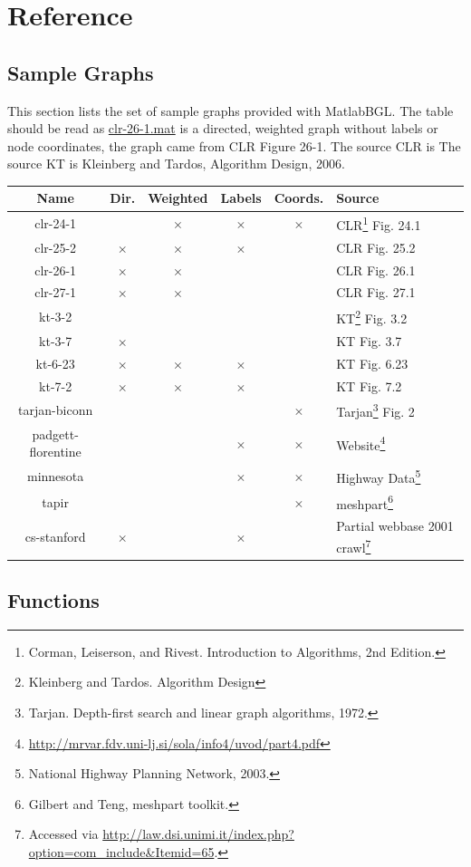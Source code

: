 \documentclass[12pt]{article}
\newcommand{\mycmd}[1]{\url{#1}}
\begin{document}
\section{Reference}

\subsection{Sample Graphs}
This section lists the set of sample graphs provided with MatlabBGL.  The table should be read as \mycmd{clr-26-1.mat} is a directed, weighted graph without labels or node coordinates, the graph came from CLR Figure 26-1.  The source CLR is   The source KT is Kleinberg and Tardos, Algorithm Design, 2006.  
\begin{center}
\begin{tabularx}{\linewidth}{c|cc|cc|X}
\textbf{Name} & \textbf{Dir.} & \textbf{Weighted} & \textbf{Labels} & \textbf{Coords.} & \textbf{Source}\\
\hline
clr-24-1 & & $\times$ & $\times$ & $\times$ & CLR\footnote{Corman, Leiserson, and Rivest. Introduction
 to Algorithms, 2nd Edition.} Fig. 24.1\\
clr-25-2 & $\times$ & $\times$ & $\times$ & & CLR Fig. 25.2\\
clr-26-1 & $\times$ & $\times$ & & & CLR Fig. 26.1\\
clr-27-1 &  $\times$ & $\times$ & & & CLR Fig. 27.1\\
kt-3-2 &  &  & & & KT\footnote{ Kleinberg and Tardos. Algorithm Design} Fig. 3.2\\
kt-3-7 & $\times$ &  & & & KT Fig. 3.7\\
kt-6-23 & $\times$ & $\times$ & $\times$ & & KT Fig. 6.23\\
kt-7-2 & $\times$ & $\times$ & $\times$& & KT Fig. 7.2\\
tarjan-biconn & & & & $\times$ & Tarjan\footnote{Tarjan.  Depth-first search and linear graph algorithms, 1972.} Fig. 2\\
padgett-florentine & & & $\times$ & $\times$ &  Website\footnote{\url{http://mrvar.fdv.uni-lj.si/sola/info4/uvod/part4.pdf}}\\
minnesota & & & $\times$ & $\times$ & Highway Data\footnote{National Highway Planning Network, 2003.}\\
tapir & & & & $\times$ & meshpart\footnote{Gilbert and Teng, meshpart toolkit.} \\
cs-stanford & $\times$ & & $\times$ & & Partial webbase 2001 crawl\footnote{Accessed via \url{http://law.dsi.unimi.it/index.php?option=com_include&Itemid=65}.}
\end{tabularx}
\end{center}

\subsection{Functions}


\end{document}
